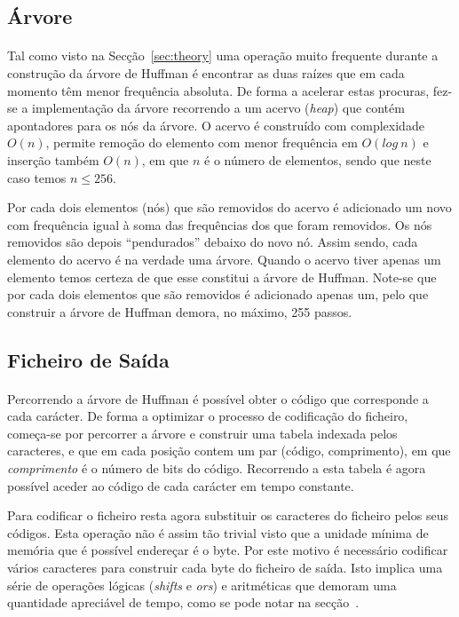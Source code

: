 \documentclass[a4paper]{article}
\begin{document}
	\subsection{Árvore}

	\paragraph{} Tal como visto na Secção~\ref{sec:theory} uma operação muito frequente durante a construção da árvore de Huffman é encontrar as duas raízes que em cada momento têm menor frequência absoluta. De forma a acelerar estas procuras, fez-se a implementação da árvore recorrendo a um acervo (\textit{heap}) que contém apontadores para os nós da árvore. O acervo é construído com complexidade $O(n)$, permite remoção do elemento com menor frequência em $O(log\ n)$ e inserção também $O(n)$, em que $n$ é o número de elementos, sendo que neste caso temos $n \leq 256$.

	Por cada dois elementos (nós) que são removidos do acervo é adicionado um novo com frequência igual à soma das frequências dos que foram removidos. Os nós removidos são depois ``pendurados'' debaixo do novo nó. Assim sendo, cada elemento do acervo é na verdade uma árvore. Quando o acervo tiver apenas um elemento temos certeza de que esse constitui a árvore de Huffman. Note-se que por cada dois elementos que são removidos é adicionado apenas um, pelo que construir a árvore de Huffman demora, no máximo, 255 passos.

	\subsection{Ficheiro de Saída}

	\paragraph{} Percorrendo a árvore de Huffman é possível obter o código que corresponde a cada carácter. De forma a optimizar o processo de codificação do ficheiro, começa-se por percorrer a árvore e construir uma tabela indexada pelos caracteres, e que em cada posição contem um par (código, comprimento), em que \emph{comprimento} é o número de bits do código. Recorrendo a esta tabela é agora possível aceder ao código de cada carácter em tempo constante.

	Para codificar o ficheiro resta agora substituir os caracteres do ficheiro pelos seus códigos. Esta operação não é assim tão trivial visto que a unidade mínima de memória que é possível endereçar é o byte. Por este motivo é necessário codificar vários caracteres para construir cada byte do ficheiro de saída. Isto implica uma série de operações lógicas (\textit{shifts} e \textit{ors}) e aritméticas que demoram uma quantidade apreciável de tempo, como se pode notar na secção~.
\end{document}
